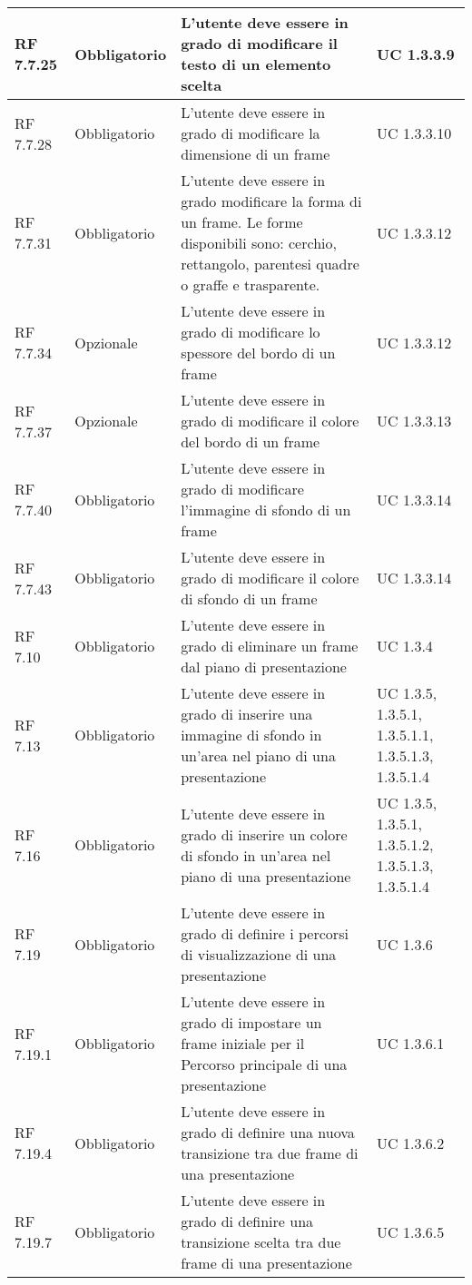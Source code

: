 {\begin{longtable} [c]{| p{2.5cm} | p{2.5cm} | p{6cm} |p{2.5cm}|}
		RF 7.7.25 & Obbligatorio & L'utente deve essere in grado di modificare il testo di un elemento scelta\ped{g} & UC 1.3.3.9\\
		\hline
		RF 7.7.28 & Obbligatorio & L'utente deve essere in grado di modificare la dimensione di un frame\ped{g} & UC 1.3.3.10\\
		\hline
		RF 7.7.31 & Obbligatorio & L'utente deve essere in grado modificare la forma di un frame\ped{g}. Le forme disponibili sono: cerchio, rettangolo, parentesi quadre o graffe e trasparente. & UC 1.3.3.12\\
		\hline
		RF 7.7.34 & Opzionale & L'utente deve essere in grado di modificare lo spessore del bordo di un frame\ped{g} & UC 1.3.3.12\\
		\hline
		RF 7.7.37 & Opzionale & L'utente deve essere in grado di modificare il colore del bordo di un frame\ped{g} & UC 1.3.3.13\\
		\hline
		RF 7.7.40 & Obbligatorio & L'utente deve essere in grado di modificare l'immagine di sfondo di un frame\ped{g} & UC 1.3.3.14\\
		\hline
		RF 7.7.43 & Obbligatorio & L'utente deve essere in grado di modificare il colore di sfondo di un frame\ped{g} & UC 1.3.3.14\\
		\hline
		RF 7.10 & Obbligatorio & L'utente deve essere in grado di eliminare un frame\ped{g} dal piano di presentazione & UC 1.3.4\\
		\hline
		RF 7.13 & Obbligatorio & L'utente deve essere in grado di inserire una immagine di sfondo in un’area nel piano di una presentazione & UC 1.3.5, 1.3.5.1, 1.3.5.1.1, 1.3.5.1.3, 1.3.5.1.4\\
		\hline
		RF 7.16 & Obbligatorio & L'utente deve essere in grado di inserire un colore di sfondo in un’area nel piano di una presentazione & UC 1.3.5, 1.3.5.1, 1.3.5.1.2, 1.3.5.1.3, 1.3.5.1.4\\
		\hline
		RF 7.19 & Obbligatorio & L'utente deve essere in grado di definire i percorsi\ped{g} di visualizzazione di una presentazione & UC 1.3.6\\
		\hline
		RF 7.19.1 & Obbligatorio & L'utente deve essere in grado di impostare un frame\ped{g} iniziale per il Percorso\ped{g} principale di una presentazione & UC 1.3.6.1\\
		\hline
		RF 7.19.4 & Obbligatorio & L’utente deve essere in grado di definire una nuova transizione tra due frame\ped{g} di una presentazione & UC 1.3.6.2\\
		\hline
		RF 7.19.7 & Obbligatorio & L'utente deve essere in grado di definire una transizione scelta tra due frame\ped{g} di una presentazione & UC 1.3.6.5\\

\end{longtable}}
